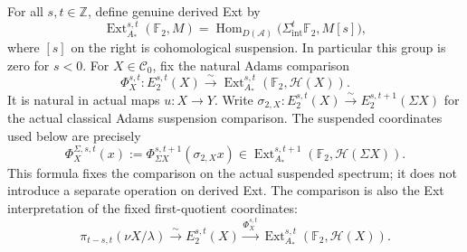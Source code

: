 \begin{definition}
For all $s,t\in\mathbb Z$, define genuine derived Ext by
\[
\operatorname{Ext}^{s,t}_{A_*}(\mathbb F_2,M)
=\operatorname{Hom}_{D(\mathcal A)}
  \bigl(\Sigma_{\mathrm{int}}^t\mathbb F_2,M[s]\bigr),
\]
where $[s]$ on the right is cohomological suspension. In particular this
group is zero for $s<0$. For $X\in\mathcal C_0$, fix the natural Adams
comparison
\[
\Phi_X^{s,t}:E_2^{s,t}(X)\xrightarrow{\sim}
\operatorname{Ext}^{s,t}_{A_*}(\mathbb F_2,\mathcal H(X)).
\]
It is natural in actual maps $u:X\to Y$. Write
$\sigma_{2,X}:E_2^{s,t}(X)\xrightarrow{\sim}E_2^{s,t+1}(\Sigma X)$
for the actual classical Adams suspension comparison. The suspended
coordinates used below are precisely
\[
\Phi_X^{\Sigma,s,t}(x)
 :=\Phi_{\Sigma X}^{s,t+1}(\sigma_{2,X}x)
 \in\operatorname{Ext}^{s,t+1}_{A_*}
 (\mathbb F_2,\mathcal H(\Sigma X)).
\]
This formula fixes the comparison on the actual suspended spectrum;
it does not introduce a separate operation on derived Ext.
The comparison is also the Ext interpretation of the fixed
first-quotient coordinates:
\[
\pi_{t-s,t}(\nu X/\lambda)
\xrightarrow{\sim}E_2^{s,t}(X)
\xrightarrow{\Phi_X^{s,t}}
\operatorname{Ext}^{s,t}_{A_*}(\mathbb F_2,\mathcal H(X)).
\]
\end{definition}

